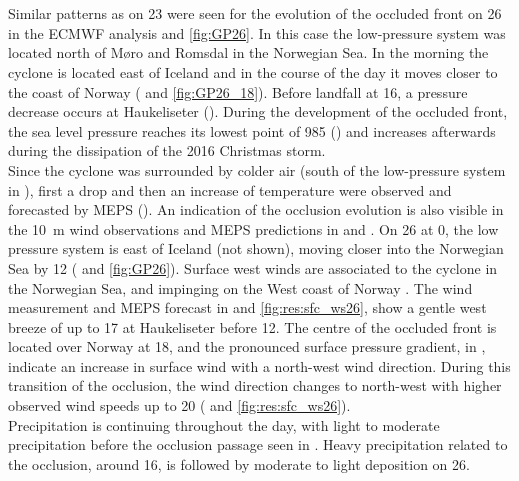 \\
\\
Similar patterns as on \SI{23}{\dec} were seen for the evolution of the occluded front on \SI{26}{\dec} in the ECMWF analysis  and \ref{fig:GP26}. In this case the low-pressure system was located north of Møro and Romsdal in the Norwegian Sea. In the morning the cyclone is located east of Iceland and in the course of the day it moves closer to the coast of Norway ( and \ref{fig:GP26_18}). Before landfall at \SI{16}{\UTC}, a pressure decrease occurs at Haukeliseter (). During the development of the occluded front, the sea level pressure reaches its lowest point of \SI{985}{\hPa} () and increases afterwards during the dissipation of the 2016 Christmas storm. 
\\
Since the cyclone was surrounded by colder air (south of the low-pressure system in ), first a drop and then an increase of temperature were observed and forecasted by MEPS (). An indication of the occlusion evolution is also visible in the \SI{10}{\metre} wind observations and MEPS predictions in  and . 
On \SI{26}{\dec} at \SI{0}{\UTC}, the low pressure system is east of Iceland (not shown), moving closer into the Norwegian Sea by \SI{12}{\UTC} ( and \ref{fig:GP26}). 
Surface west winds are associated to the cyclone in the Norwegian Sea, and impinging on the West coast of Norway . The wind measurement and MEPS forecast in  and \ref{fig:res:sfc_ws26}, show a gentle west breeze of up to \SI{17}{\mPs} at Haukeliseter before \SI{12}{\UTC}.
The centre of the occluded front is located over Norway at \SI{18}{\UTC}, and the pronounced surface pressure gradient, in , indicate an increase in surface wind with a north-west wind direction. During this transition of the occlusion, the wind direction changes to north-west with higher observed wind speeds up to \SI{20}{\mPs} ( and \ref{fig:res:sfc_ws26}). 
\\
Precipitation is continuing throughout the day, with light to moderate precipitation before the occlusion passage seen in . Heavy precipitation related to the occlusion, around \SI{16}{\UTC}, is followed by moderate to light deposition on \SI{26}{\dec}. 

